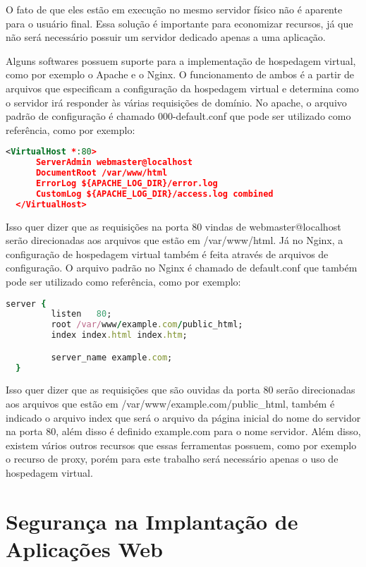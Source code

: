 O fato de que eles estão em execução no mesmo servidor físico não é aparente 
para o usuário final. Essa solução é importante para economizar recursos, 
já que não será necessário possuir um servidor dedicado apenas a uma aplicação.

Alguns softwares possuem suporte para a implementação de hospedagem virtual, como por
exemplo o Apache e o Nginx. O funcionamento de ambos é a partir de arquivos que
especificam a configuração da hospedagem virtual e determina como o servidor
irá responder às várias requisições de domínio. No apache, o arquivo padrão de configuração
é chamado 000-default.conf que pode ser utilizado como referência, como por exemplo:

\begin{lstlisting}[language=Xml,label=dice_index,caption={ Exemplo de arquivo de configuração de hospedagem virtual no apache}]
  <VirtualHost *:80>
      ServerAdmin webmaster@localhost
      DocumentRoot /var/www/html
      ErrorLog ${APACHE_LOG_DIR}/error.log
      CustomLog ${APACHE_LOG_DIR}/access.log combined
  </VirtualHost>
\end{lstlisting}

Isso quer dizer que as requisições na porta 80 vindas de webmaster@localhost serão
direcionadas aos arquivos que estão em /var/www/html. Já no Nginx, a configuração
de hospedagem virtual também é feita através de arquivos de configuração. O arquivo
padrão no Nginx é chamado de default.conf que também pode ser utilizado como
referência, como por exemplo:

\begin{lstlisting}[language=Ruby,label=dice_index,caption={ Exemplo de arquivo de configuração de hospedagem virtual no Nginx}]
  server {
         listen   80;
         root /var/www/example.com/public_html;
         index index.html index.htm;

         server_name example.com;
  }
\end{lstlisting}

Isso quer dizer que as requisições que são ouvidas da porta 80 serão direcionadas
aos arquivos que estão em /var/www/example.com/public\_html, também é indicado o
arquivo index que será o arquivo da página inicial do nome do servidor na porta 80,
além disso é definido example.com para o nome servidor. Além disso, existem vários
outros recursos que essas ferramentas possuem, como por exemplo o recurso de proxy,
porém para este trabalho será necessário apenas o uso de hospedagem virtual.

\section{Segurança na Implantação de Aplicações Web}
\label{sec:seguranca}

